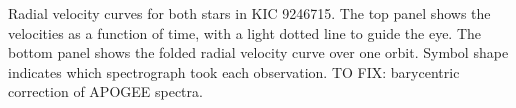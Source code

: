 \label{fig:rvfig} Radial velocity curves for both stars in KIC 9246715. The top panel shows the velocities as a function of time, with a light dotted line to guide the eye. The bottom panel shows the folded radial velocity curve over one orbit. Symbol shape indicates which spectrograph took each observation.
TO FIX: barycentric correction of APOGEE spectra.
